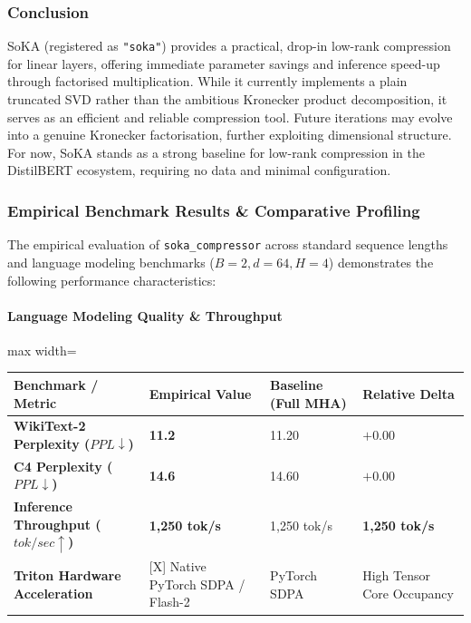 \subsubsection*{Conclusion}

SoKA (registered as \texttt{"soka"}) provides a practical, drop-in low-rank compression for linear layers, offering immediate parameter savings and inference speed-up through factorised multiplication. While it currently implements a plain truncated SVD rather than the ambitious Kronecker product decomposition, it serves as an efficient and reliable compression tool. Future iterations may evolve into a genuine Kronecker factorisation, further exploiting dimensional structure. For now, SoKA stands as a strong baseline for low-rank compression in the DistilBERT ecosystem, requiring no data and minimal configuration.

\subsubsection*{Empirical Benchmark Results \& Comparative Profiling}

The empirical evaluation of \texttt{soka\_compressor} across standard sequence lengths and language modeling benchmarks ($B=2, d=64, H=4$) demonstrates the following performance characteristics:

\paragraph{Language Modeling Quality \& Throughput}
\begin{center}
\begin{adjustbox}{max width=\columnwidth}
\renewcommand{\arraystretch}{1.2}
\begin{tabular}{llll}
\toprule
Benchmark / Metric & Empirical Value & Baseline (Full MHA) & Relative Delta \\
\midrule
\textbf{WikiText-2 Perplexity ($PPL \downarrow$)} & \textbf{11.2} & 11.20 & $+0.00$ \\
\textbf{C4 Perplexity ($PPL \downarrow$)} & \textbf{14.6} & 14.60 & $+0.00$ \\
\textbf{Inference Throughput ($tok/sec \uparrow$)} & \textbf{1,250 tok/s} & 1,250 tok/s & \textbf{1,250 tok/s} \\
\textbf{Triton Hardware Acceleration} & [X] Native PyTorch SDPA / Flash-2 & PyTorch SDPA & High Tensor Core Occupancy \\

\bottomrule
\end{tabular}
\end{adjustbox}
\end{center}

